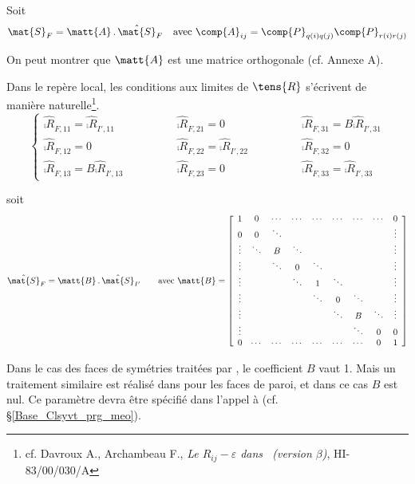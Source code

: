 Soit
\begin{equation}
\mat{S}_{F}=\matt{A}\,.\,\hat{\mat{S}}_F\quad\text{avec }
\comp{A}_{ij}=\comp{P}_{q(i)q(j)}\comp{P}_{r(i)r(j)}
\end{equation}

On peut montrer que $\matt{A}$ est une matrice orthogonale (cf. Annexe A).

Dans le rep\`ere local, les conditions aux limites de $\tens{R}$ s'\'ecrivent de
mani\`ere naturelle\footnote{cf. Davroux A., Archambeau F., {\em Le
$R_{ij}-\varepsilon$ dans \CS\ (version $\beta$)}, HI-83/00/030/A}.
\begin{equation}
\label{Base_Clsyvt_eq_clRij}%
\left\{\begin{array}{lll}
\hat{\comp{R}}_{F,11}=\hat{\comp{R}}_{I',11} \qquad\qquad&
\hat{\comp{R}}_{F,21}=0 \qquad\qquad&
\hat{\comp{R}}_{F,31}=B\hat{\comp{R}}_{I',31} \\
\hat{\comp{R}}_{F,12}=0 \qquad\qquad&
\hat{\comp{R}}_{F,22}=\hat{\comp{R}}_{I',22} \qquad\qquad&
\hat{\comp{R}}_{F,32}=0 \\
\hat{\comp{R}}_{F,13}=B\hat{\comp{R}}_{I',13} \qquad\qquad&
\hat{\comp{R}}_{F,23}=0 \qquad\qquad&
\hat{\comp{R}}_{F,33}=\hat{\comp{R}}_{I',33}
\end{array}\right.
\end{equation}

soit
\renewcommand{\arraystretch}{0.5}
\begin{equation}
\hat{\mat{S}}_F=\matt{B}\,.\,\hat{\mat{S}}_{I'}
\qquad\text{avec }\matt{B}=
\left[\begin{array}{ccccccccc}
1&0&\cdots&\cdots&\cdots&\cdots&\cdots&\cdots&0\\
0&0&\ddots&&&&&&\vdots\\
\vdots&\ddots&B&\ddots&&&&&\vdots\\
\vdots&&\ddots&0&\ddots&&&&\vdots\\
\vdots&&&\ddots&1&\ddots&&&\vdots\\
\vdots&&&&\ddots&0&\ddots&&\vdots\\
\vdots&&&&&\ddots&B&\ddots&\vdots\\
\vdots&&&&&&\ddots&0&0\\
0&\cdots&\cdots&\cdots&\cdots&\cdots&\cdots&0&1
\end{array}\right]
\end{equation}
\renewcommand{\arraystretch}{1.}

Dans le cas des faces de sym\'etries trait\'ees par , le
coefficient $B$ vaut 1. Mais un traitement similaire est r\'ealis\'e dans
 pour les faces de paroi, et dans ce cas $B$ est nul. Ce
param\`etre devra \^etre sp\'ecifi\'e dans l'appel \`a 
(cf. \S\ref{Base_Clsyvt_prg_meo}).

